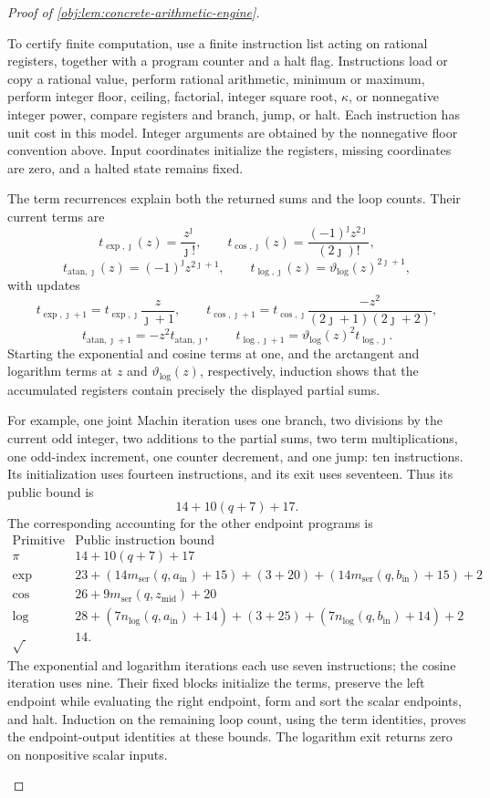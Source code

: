 \begin{proof}[Proof of \cref{obj:lem:concrete-arithmetic-engine}]
\begin{enumerate}
To certify finite computation, use a finite instruction list acting on rational registers, together with a program counter and a halt flag. Instructions load or copy a rational value, perform rational arithmetic, minimum or maximum, perform integer floor, ceiling, factorial, integer square root, \(\kappa\), or nonnegative integer power, compare registers and branch, jump, or halt. Each instruction has unit cost in this model. Integer arguments are obtained by the nonnegative floor convention above. Input coordinates initialize the registers, missing coordinates are zero, and a halted state remains fixed.

The term recurrences explain both the returned sums and the loop counts. Their current terms are
\[
t_{\exp,\jmath}(z)=\frac{z^\jmath}{\jmath!},
\qquad
t_{\cos,\jmath}(z)=\frac{(-1)^\jmath z^{2\jmath}}{(2\jmath)!},
\]
\[
t_{\mathrm{atan},\jmath}(z)=(-1)^\jmath z^{2\jmath+1},
\qquad
t_{\log,\jmath}(z)=\vartheta_{\log}(z)^{2\jmath+1},
\]
with updates
\[
t_{\exp,\jmath+1}
 =t_{\exp,\jmath}\frac{z}{\jmath+1},
\qquad
t_{\cos,\jmath+1}
 =t_{\cos,\jmath}\frac{-z^2}{(2\jmath+1)(2\jmath+2)},
\]
\[
t_{\mathrm{atan},\jmath+1}
 =-z^2t_{\mathrm{atan},\jmath},
\qquad
t_{\log,\jmath+1}
 =\vartheta_{\log}(z)^2t_{\log,\jmath}.
\]
Starting the exponential and cosine terms at one, and the arctangent and logarithm terms at \(z\) and \(\vartheta_{\log}(z)\), respectively, induction shows that the accumulated registers contain precisely the displayed partial sums.

For example, one joint Machin iteration uses one branch, two divisions by the current odd integer, two additions to the partial sums, two term multiplications, one odd-index increment, one counter decrement, and one jump: ten instructions. Its initialization uses fourteen instructions, and its exit uses seventeen. Thus its public bound is
\[
14+10(q+7)+17.
\]
The corresponding accounting for the other endpoint programs is
\[
\begin{array}{c|l}
\text{Primitive}&\text{Public instruction bound}\\ \hline
\pi&14+10(q+7)+17\\
\exp&
23+(14m_{\mathrm{ser}}(q,a_{\mathrm{in}})+15)
 +(3+20)+(14m_{\mathrm{ser}}(q,b_{\mathrm{in}})+15)+2\\
\cos&26+9m_{\mathrm{ser}}(q,z_{\mathrm{mid}})+20\\
\log&
28+(7n_{\log}(q,a_{\mathrm{in}})+14)
 +(3+25)+(7n_{\log}(q,b_{\mathrm{in}})+14)+2\\
\sqrt{\ }&14 .
\end{array}
\]
The exponential and logarithm iterations each use seven instructions; the cosine iteration uses nine. Their fixed blocks initialize the terms, preserve the left endpoint while evaluating the right endpoint, form and sort the scalar endpoints, and halt. Induction on the remaining loop count, using the term identities, proves the endpoint-output identities at these bounds. The logarithm exit returns zero on nonpositive scalar inputs.


\end{enumerate}
\end{proof}
